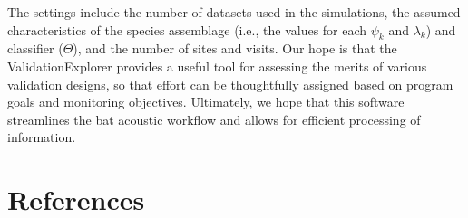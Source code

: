 \documentclass[
]{article}
\begin{document}
\noindent The settings include the number of datasets used in the simulations, the assumed characteristics of the species assemblage (i.e., the values for each \(\psi_k\) and \(\lambda_k\)) and classifier (\(\Theta\)), and the number of sites and visits. Our hope is that the ValidationExplorer provides a useful tool for assessing the merits of various validation designs, so that effort can be thoughtfully assigned based on program goals and monitoring objectives. Ultimately, we hope that this software streamlines the bat acoustic workflow and allows for efficient processing of information.

\hypertarget{references}{%
\section*{References}\label{references}}
\end{document}

